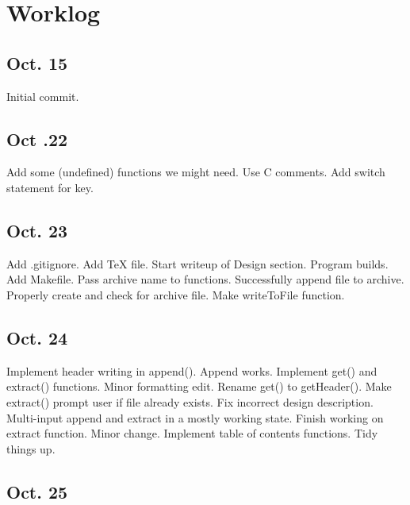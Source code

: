 \documentclass[12pt,letterpaper]{article}
\begin{document}
\section*{Worklog}

\subsection*{Oct. 15}

\begin{itemize}
Initial commit.
\end{itemize}

\subsection*{Oct .22}

\begin{itemize}
Add some (undefined) functions we might need.
Use C comments.
Add switch statement for key.
\end{itemize}

\subsection*{Oct. 23}

\begin{itemize}
Add .gitignore.
Add TeX file.
Start writeup of Design section.
Program builds.
Add Makefile.
Pass archive name to functions.
Successfully append file to archive.
Properly create and check for archive file.
Make writeToFile function.
\end{itemize}

\subsection*{Oct. 24}

\begin{itemize}
Implement header writing in append().
Append works.
Implement get() and extract() functions.
Minor formatting edit.
Rename get() to getHeader().
Make extract() prompt user if file already exists.
Fix incorrect design description.
Multi-input append and extract in a mostly working state.
Finish working on extract function.
Minor change.
Implement table of contents functions.
Tidy things up.
\end{itemize}

\subsection*{Oct. 25}
\end{document}
